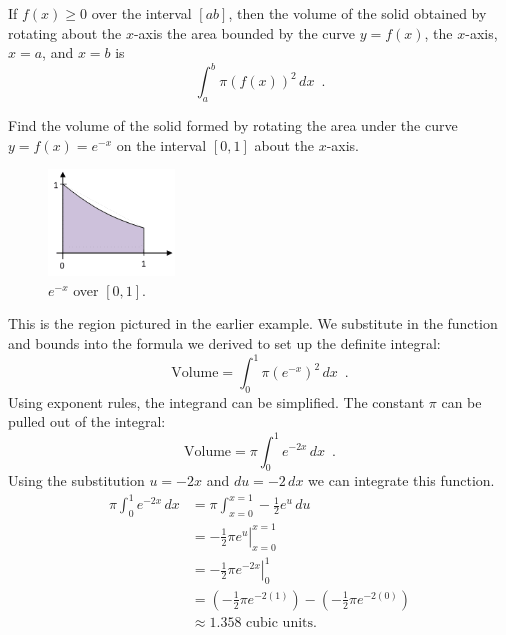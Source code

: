\begin{theorem}[Volume]
If $f(x)\geq 0$ over the interval $[a b]$, then the volume of the solid obtained by rotating about the $x$-axis the area bounded by the curve $y=f(x)$, the $x$-axis, $x=a$, and $x=b$ is
$$\int_a^b \pi(f(x))^2\,dx \enspace .$$
\end{theorem}
\begin{example}
Find the volume of the solid formed by rotating the area under the curve $y=f(x)=e^{-x}$ on the interval $[0,1]$ about the $x$-axis.

\begin{figure}[!ht]
  \centering
    \includegraphics[width=0.3\textwidth]{img/chap5/image073.png}
    \caption{$e^{-x}$ over $[0,1]$.}
    \label{fig:5-8-enegx}
\end{figure}

\begin{solution}
This is the region pictured in the earlier example. We substitute in the function and bounds into the formula we derived to set up the definite integral:
$$\text{Volume} = \int_0^1 \pi (e^{-x})^2\,dx \enspace .$$
Using exponent rules, the integrand can be simplified. The constant $\pi$ can be pulled out of the integral:
$$\text{Volume} = \pi\int_0^1e^{-2x}\,dx \enspace .$$
Using the substitution $u=-2x$ and $du = -2\,dx$ we can integrate this function.
\begin{align*}
\pi \int_0^1 e^{-2x}\,dx &= \pi\int_{x=0}^{x=1}-\frac{1}{2}e^u\,du\\
  &= \left.-\frac{1}{2}\pi e^u\right|_{x=0}^{x=1} \\
  &= \left.-\frac{1}{2}\pi e^{-2x}\right|_0^1\\
  &=  \left(-\frac{1}{2}\pi e^{-2(1)}\right)-\left(-\frac{1}{2}\pi e^{-2(0)}\right) \\
  &\approx 1.358 \text{ cubic units}.
\end{align*}
\end{solution}\end{example}
